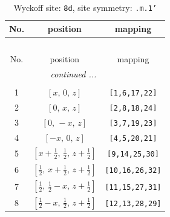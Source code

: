 \documentclass[fleqn,8pt]{jsarticle}
\begin{document}
\begin{longtable}{ccc}
\caption{Wyckoff site: {\tt 8d}, site symmetry: {\tt .m.1'}}
 \\
 \hline \hline
No. & position & mapping \\ \hline \endfirsthead

\multicolumn{2}{l}{\tablename\ \thetable{}} \\
 \hline \hline
No. & position & mapping \\ \hline \endhead

 \hline \hline
\multicolumn{2}{r}{\footnotesize\it continued ...} \\ \endfoot

 \hline \hline
\multicolumn{2}{r}{} \\ \endlastfoot

1 & $\left[ x,\, 0,\, z \right]$ & {\tt [1,6,17,22]} \\ \hline
2 & $\left[ 0,\, x,\, z \right]$ & {\tt [2,8,18,24]} \\ \hline
3 & $\left[ 0,\, - x,\, z \right]$ & {\tt [3,7,19,23]} \\ \hline
4 & $\left[ - x,\, 0,\, z \right]$ & {\tt [4,5,20,21]} \\ \hline
5 & $\left[ x + \frac{1}{2},\, \frac{1}{2},\, z + \frac{1}{2} \right]$ & {\tt [9,14,25,30]} \\ \hline
6 & $\left[ \frac{1}{2},\, x + \frac{1}{2},\, z + \frac{1}{2} \right]$ & {\tt [10,16,26,32]} \\ \hline
7 & $\left[ \frac{1}{2},\, \frac{1}{2} - x,\, z + \frac{1}{2} \right]$ & {\tt [11,15,27,31]} \\ \hline
8 & $\left[ \frac{1}{2} - x,\, \frac{1}{2},\, z + \frac{1}{2} \right]$ & {\tt [12,13,28,29]} \\
\end{longtable}
\renewcommand{\arraystretch}{1.2}
\end{document}
